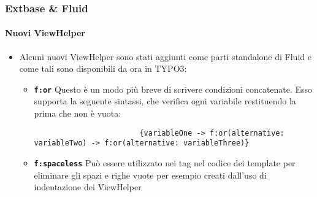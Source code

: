 \begin{frame}[fragile]
	\frametitle{Extbase \& Fluid}
	\framesubtitle{Nuovi ViewHelper}

	\lstset{basicstyle=\tiny\ttfamily}

	\begin{itemize}
		\item Alcuni nuovi ViewHelper sono stati aggiunti come parti standalone di Fluid
			e come tali sono disponibili da ora in TYPO3:

			\begin{itemize}

				\item \textbf{\texttt{f:or}}\newline
					Questo è un modo più breve di scrivere condizioni concatenate.
					Esso supporta la seguente sintassi, che verifica ogni variabile
					restituendo la prima che non è vuota:

					\begin{lstlisting}
						{variableOne -> f:or(alternative: variableTwo) -> f:or(alternative: variableThree)}
					\end{lstlisting}

				\item \textbf{\texttt{f:spaceless}}\newline
					Può essere utilizzato nei tag nel codice dei template per eliminare
					gli spazi e righe vuote per esempio creati dall'uso di indentazione
					dei ViewHelper
			\end{itemize}

	\end{itemize}

\end{frame}


